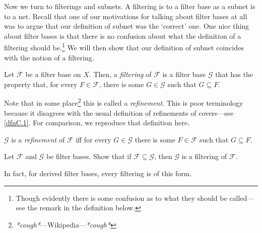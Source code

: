 Now we turn to filterings and subnets.  A filtering is to a filter base as a subnet is to a net.  Recall that one of our motivations for talking about filter bases at all was to argue that our definition of subnet was the `correct' one.  One nice thing about filter bases is that there is no confusion about what the definition of a filtering should be.\footnote{Though evidently there is some confusion as to what they should be called---see the remark in the definition below.}  We will then show that our definition of subnet coincides with the notion of a filtering.
\begin{dfn}[Filtering]\label{Filtering}
Let $\mathcal{F}$ be a filter base on $X$.  Then, a \emph{filtering} of $\mathcal{F}$ is a filter base $\mathcal{G}$ that has the property that, for every $F\in \mathcal{F}$, there is some $G\in \mathcal{G}$ such that $G\subseteq F$.
\begin{rmk}
Note that in some place\footnote{\emph{*cough*}---Wikipedia---\emph{*cough*}} this is called a \emph{refinement}.  This is poor terminology because it disagrees with the usual definition of refinements of covers---see \cref{dfnC.1}.  For comparison, we reproduce that definition here.
\begin{textequation}
$\mathcal{G}$ is a \emph{refinement} of $\mathcal{F}$ iff for every $G\in \mathcal{G}$ there is some $F\in \mathcal{F}$ such that $G\subseteq F$.
\end{textequation}
\end{rmk}
\end{dfn}
\begin{exr}\label{exr4.4.8}
Let $\mathcal{F}$ and $\mathcal{G}$ be filter bases.  Show that if $\mathcal{F}\subseteq \mathcal{G}$, then $\mathcal{G}$ is a filtering of $\mathcal{F}$.
\end{exr}
In fact, for derived filter bases, every filtering is of this form.
